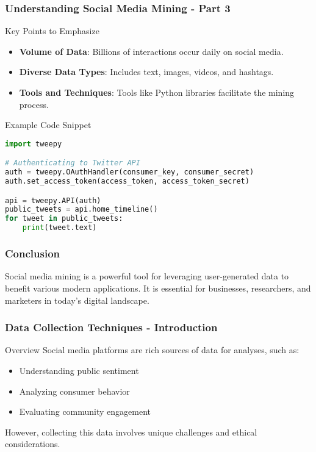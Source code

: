 \documentclass{beamer}
\begin{document}
\begin{frame}[fragile]
    \frametitle{Understanding Social Media Mining - Part 3}
    \begin{block}{Key Points to Emphasize}
        \begin{itemize}
            \item \textbf{Volume of Data}: Billions of interactions occur daily on social media.
            \item \textbf{Diverse Data Types}: Includes text, images, videos, and hashtags.
            \item \textbf{Tools and Techniques}: Tools like Python libraries facilitate the mining process.
        \end{itemize}
    \end{block}

    \begin{block}{Example Code Snippet}
        \begin{lstlisting}[language=Python]
import tweepy

# Authenticating to Twitter API
auth = tweepy.OAuthHandler(consumer_key, consumer_secret)
auth.set_access_token(access_token, access_token_secret)

api = tweepy.API(auth)
public_tweets = api.home_timeline()
for tweet in public_tweets:
    print(tweet.text)
        \end{lstlisting}
    \end{block}
\end{frame}

\begin{frame}[fragile]
    \frametitle{Conclusion}
    Social media mining is a powerful tool for leveraging user-generated data to benefit various modern applications. It is essential for businesses, researchers, and marketers in today's digital landscape.
\end{frame}

\begin{frame}[fragile]
    \frametitle{Data Collection Techniques - Introduction}
    \begin{block}{Overview}
        Social media platforms are rich sources of data for analyses, such as:
        \begin{itemize}
            \item Understanding public sentiment
            \item Analyzing consumer behavior
            \item Evaluating community engagement
        \end{itemize}
        However, collecting this data involves unique challenges and ethical considerations.
    \end{block}
\end{frame}
\end{document}
